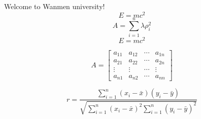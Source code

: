 \documentclass{article}
\begin{document}
Welcome to Wanmen university!
$$E=mc^2$$
$$A=\sum\limits_{i=1}^n \lambda \rho_i^2$$
\begin{equation}
E=mc^2
\end{equation}

\begin{equation}
A=\begin{bmatrix}
a_{11}&a_{12}&\cdots&a_{1n}\\
a_{21}&a_{22}&\cdots&a_{2n}\\
\vdots&\vdots&\cdots&\vdots\\
a_{n1}&a_{n2}&\cdots&a_{nn}
\end{bmatrix}
\end{equation}

\begin{equation}
r=\frac{\sum\limits^n_{i=1}(x_i-\bar x)(y_i-\bar y)}
{\sqrt{\sum\limits^n_{i=1}(x_i-\bar x)^2
\sum\limits^n_{i=1}(y_i-\bar y)^2}}
\end{equation}
\end{document}
